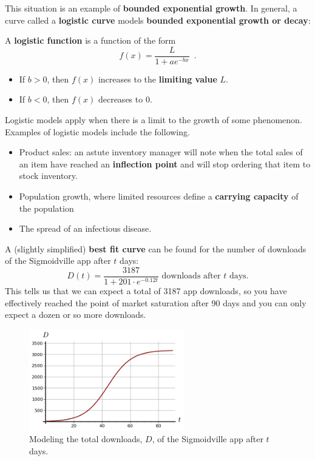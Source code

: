 This situation is an example of {\bf bounded exponential growth}. In general, a curve called a {\bf logistic curve} models {\bf bounded exponential growth or decay}:  

\begin{definition}
  A {\bf logistic function} is a function of the form
  $$f(x) = \dfrac{L}{1+ae^{-bx}} \enspace .$$
    \begin{itemize}    
    \item If $b>0$, then $f(x)$ increases to the {\bf limiting value} $L$.
    \item If $b<0$, then $f(x)$ decreases to 0.
    \end{itemize}
\end{definition}

Logistic models apply when there is a limit to the growth of some phenomenon. Examples of logistic models include the following.
    \begin{itemize}
    \item Product sales: an astute inventory manager will note when the total sales of an item have reached an {\bf inflection point} and will stop ordering that item to stock inventory.
    \item Population growth, where limited resources define a {\bf carrying capacity} of the population 
    \item The spread of an infectious disease.
    \end{itemize}

\begin{example} A (slightly simplified) {\bf best fit curve} can be found for the number of downloads of the Sigmoidville app after $t$ days: 
$$D(t) = \frac{3187}{1+201\cdot e^{-0.12t}} \text{ downloads after } t \text{ days.}$$
This tells us that we can expect a total of 3187 app downloads, so you have effectively reached the point of market saturation after 90 days and you can only expect a dozen or so more downloads.

\begin{figure}[!ht]
	\centering
	\includegraphics[width = 0.6\textwidth]{img/chap1/sec1-7/1-7-app-graph.png}
	\caption{Modeling the total downloads, $D$, of the Sigmoidville app after $t$ days.}
    \label{fig:1-7-app-graph}
	\end{figure}
\end{example}

